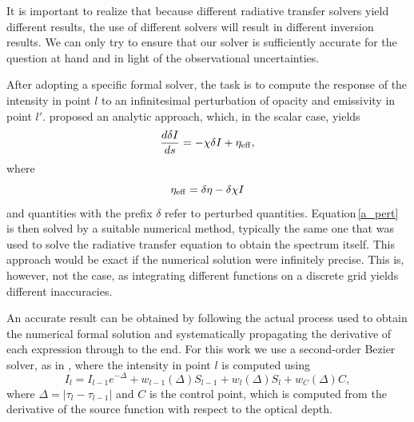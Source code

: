 \documentclass[referee]{aa}
\begin{document}
It is important to realize that because different radiative transfer solvers yield different results, the use of different solvers will result in different inversion results. We can only try to ensure that our solver is sufficiently accurate for the question at hand and in light of the observational uncertainties.

After adopting a specific formal solver, the task is to compute the response of the intensity in point $l$ to an infinitesimal perturbation of opacity and emissivity in point $l'$. \citet{dtibook} proposed an analytic approach, which, in the scalar case, yields
\begin{equation}
 \frac{d\delta I}{ds} = -\chi \delta I + \eta_{\rm{eff}},
 \label{a_pert}
\end{equation}
where
\begin{equation}
\eta_{\rm{eff}} = \delta \eta - \delta \chi I
\end{equation}
and quantities with the prefix $\delta$ refer to perturbed quantities. Equation\,\ref{a_pert} is then solved by a suitable numerical method, typically the same one that was used to solve the radiative transfer equation to obtain the spectrum itself. This approach would be exact if the numerical solution were infinitely precise. This is, however, not the case, as integrating different functions on a discrete grid yields different inaccuracies. 

An accurate result can be obtained by following the actual process used to obtain the numerical formal solution and systematically propagating the derivative of each expression through to the end. For this work we use a second-order Bezier solver, as in \citet{JaimeBezier}, where the intensity in point $l$ is computed using
\begin{equation}
 I_l = I_{l-1} e^{-\Delta} + w_{l-1}(\Delta)S_{l-1} + w_{l}(\Delta) S_l + w_C(\Delta) C,
 \label{bezier}
\end{equation}
where $\Delta=|\tau_l - \tau_{l-1}|$ and $C$ is the  control point, which is computed from the derivative of the source function with respect to the optical depth. 
\end{document}
